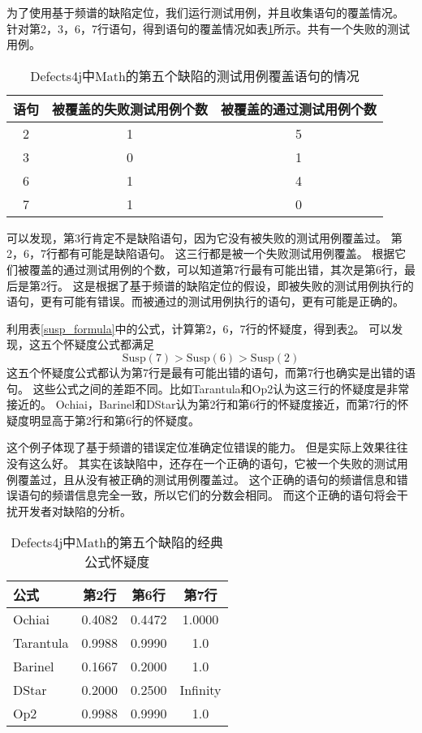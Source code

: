 为了使用基于频谱的缺陷定位，我们运行测试用例，并且收集语句的覆盖情况。
针对第2，3，6，7行语句，得到语句的覆盖情况如表\ref{math_5_statecover}所示。共有一个失败的测试用例。

\begin{table}
\centering
\begin{tabular}{|c|c|c|}
\hline
语句 & 被覆盖的失败测试用例个数 & 被覆盖的通过测试用例个数 \\
\hline
2 & 1 & 5 \\
3 & 0 & 1 \\
6 & 1 & 4 \\
7 & 1 & 0 \\
\hline
\end{tabular}
\caption{Defects4j中Math的第五个缺陷的测试用例覆盖语句的情况}
\label{math_5_statecover}
\end{table}

可以发现，第3行肯定不是缺陷语句，因为它没有被失败的测试用例覆盖过。
第2，6，7行都有可能是缺陷语句。
这三行都是被一个失败测试用例覆盖。
根据它们被覆盖的通过测试用例的个数，可以知道第7行最有可能出错，其次是第6行，最后是第2行。
这是根据了基于频谱的缺陷定位的假设，即被失败的测试用例执行的语句，更有可能有错误。而被通过的测试用例执行的语句，更有可能是正确的。

利用表\ref{susp_formula}中的公式，计算第2，6，7行的怀疑度，得到表\ref{math_5_susp}。
可以发现，这五个怀疑度公式都满足
$$
\mathrm{Susp}(7) > \mathrm{Susp}(6) > \mathrm{Susp}(2)
$$
这五个怀疑度公式都认为第7行是最有可能出错的语句，而第7行也确实是出错的语句。
这些公式之间的差距不同。比如Tarantula和Op2认为这三行的怀疑度是非常接近的。
Ochiai，Barinel和DStar认为第2行和第6行的怀疑度接近，而第7行的怀疑度明显高于第2行和第6行的怀疑度。

这个例子体现了基于频谱的错误定位准确定位错误的能力。
但是实际上效果往往没有这么好。
其实在该缺陷中，还存在一个正确的语句，它被一个失败的测试用例覆盖过，且从没有被正确的测试用例覆盖过。
这个正确的语句的频谱信息和错误语句的频谱信息完全一致，所以它们的分数会相同。
而这个正确的语句将会干扰开发者对缺陷的分析。

\begin{table}
\centering
\begin{tabular}{|l|c|c|c|}
\hline
公式 & 第2行 & 第6行 & 第7行 \\
\hline
Ochiai & 0.4082 & 0.4472 & 1.0000 \\
\hline
Tarantula & 0.9988 & 0.9990 & 1.0 \\
\hline
Barinel & 0.1667 & 0.2000 & 1.0 \\
\hline
DStar & 0.2000 & 0.2500 & Infinity \\
\hline
Op2 & 0.9988 & 0.9990 & 1.0 \\
\hline
\end{tabular}
\caption{Defects4j中Math的第五个缺陷的经典公式怀疑度}
\label{math_5_susp}
\end{table}

